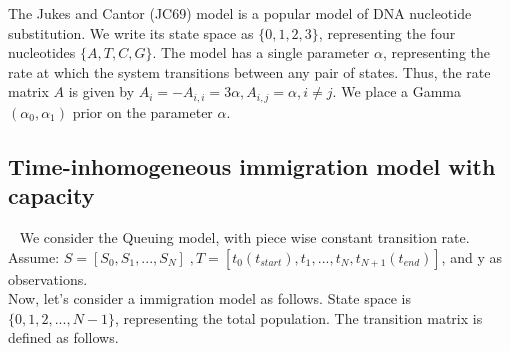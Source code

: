   The Jukes and Cantor (JC69) model is a popular model of DNA nucleotide
  substitution.  We write its state space as $\{0, 1, 2, 3\}$, representing the 
  four nucleotides $\{A, T, C, G\}$.  The model has a single parameter $\alpha$, 
  representing the rate at which the system transitions between any pair of 
  states. Thus, the rate matrix $A$ is given by 
$A_i = -A_{i,i} = 3\alpha, A_{i, j} = \alpha,i \neq j.$
We place a Gamma$(\alpha_0,\alpha_1)$ prior on the parameter $\alpha$.


\subsection{Time-inhomogeneous immigration model with capacity}~
We consider the Queuing model, with piece wise constant transition rate. 
\noindent Assume: $S = [S_0,S_1, ...,S_N] \;, T = [t_0(t_{start}), t_1,...,t_N, t_{N+1}(t_{end})]$, and y as observations.\\
Now, let's consider a immigration model as follows. State space is $\{0, 1, 2, ..., N - 1\}$, representing the total population. The transition matrix is defined as follows. 

